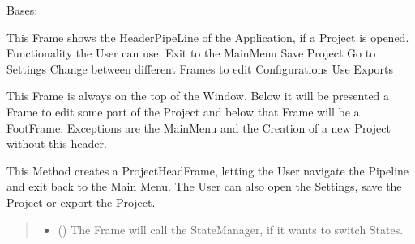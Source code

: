 \documentclass[letterpaper,10pt,english]{sphinxmanual}
\begin{document}
\begin{fulllineitems}
\label{\detokenize{apidoc/src.osm_configurator.view.toplevelframes:src.osm_configurator.view.toplevelframes.project_head_frame.ProjectHeadFrame}}
\pysigstartsignatures
{}
\pysigstopsignatures
\sphinxAtStartPar
Bases: {\hyperref[\detokenize{apidoc/src.osm_configurator.view.toplevelframes:src.osm_configurator.view.toplevelframes.top_level_frame.TopLevelFrame}]{}}

\sphinxAtStartPar
This Frame shows the Header\sphinxhyphen{}PipeLine of the Application, if a Project is opened.
Functionality the User can use:
\sphinxhyphen{} Exit to the MainMenu
\sphinxhyphen{} Save Project
\sphinxhyphen{} Go to Settings
\sphinxhyphen{} Change between different Frames to edit Configurations
\sphinxhyphen{} Use Exports

\sphinxAtStartPar
This Frame is always on the top of the Window. Below it will be presented a Frame to edit some part of the Project
and below that Frame will be a FootFrame.
Exceptions are the MainMenu and the Creation of a new Project without this header.

\begin{fulllineitems}
\label{\detokenize{apidoc/src.osm_configurator.view.toplevelframes:src.osm_configurator.view.toplevelframes.project_head_frame.ProjectHeadFrame.__init__}}
\pysigstartsignatures
{}
\pysigstopsignatures
\sphinxAtStartPar
This Method creates a ProjectHeadFrame, letting the User navigate the Pipeline and exit back to the Main Menu.
The User can also open the Settings, save the Project or export the Project.
\begin{quote}\begin{description}
\begin{itemize}
\item {} 
\sphinxAtStartPar
{} ({\hyperref[\detokenize{apidoc/src.osm_configurator.view.states:src.osm_configurator.view.states.state_manager.StateManager}]{}}) \textendash{} The Frame will call the StateManager, if it wants to switch States.


\end{itemize}
\end{description}
\end{quote}
\end{fulllineitems}
\end{fulllineitems}
\end{document}
